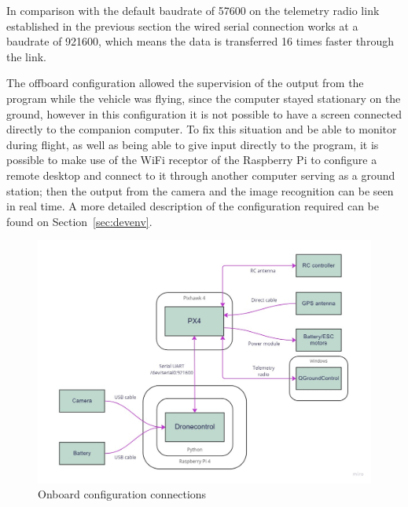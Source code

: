 In comparison with the default baudrate of 57600 on the telemetry radio link established in the previous section the wired serial connection works at a baudrate of 921600, which means the data is transferred 16 times faster through the link.

The offboard configuration allowed the supervision of the output from the program while the vehicle was flying, since the computer stayed stationary on the ground, however in this configuration it is not possible to have a screen connected directly to the companion computer.
To fix this situation and be able to monitor during flight, as well as being able to give input directly to the program, it is possible to make use of the WiFi receptor of the Raspberry Pi to configure a remote desktop and connect to it through another computer serving as a ground station;
then the output from the camera and the image recognition can be seen in real time.
A more detailed description of the configuration required can be found on Section~\ref{sec:devenv}.

\begin{figure}
  \centering
  \includegraphics[width=\textwidth,keepaspectratio]{img/onboard-diagram.jpg}
  \caption{Onboard configuration connections}\label{fig:onboard-config}
\end{figure}

